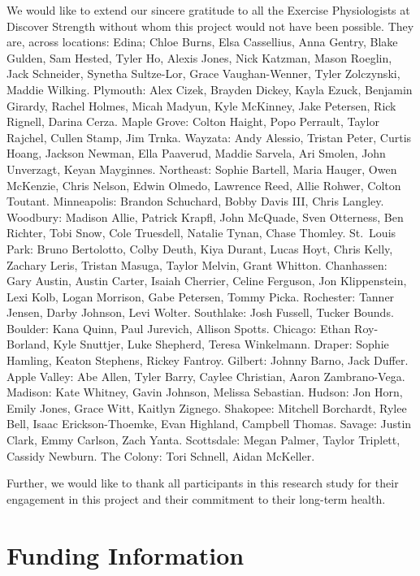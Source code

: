 \documentclass[
]{article}
\begin{document}
We would like to extend our sincere gratitude to all the Exercise
Physiologists at Discover Strength without whom this project would not
have been possible. They are, across locations: Edina; Chloe Burns, Elsa
Cassellius, Anna Gentry, Blake Gulden, Sam Hested, Tyler Ho, Alexis
Jones, Nick Katzman, Mason Roeglin, Jack Schneider, Synetha Sultze-Lor,
Grace Vaughan-Wenner, Tyler Zolczynski, Maddie Wilking. Plymouth: Alex
Cizek, Brayden Dickey, Kayla Ezuck, Benjamin Girardy, Rachel Holmes,
Micah Madyun, Kyle McKinney, Jake Petersen, Rick Rignell, Darina Cerza.
Maple Grove: Colton Haight, Popo Perrault, Taylor Rajchel, Cullen Stamp,
Jim Trnka. Wayzata: Andy Alessio, Tristan Peter, Curtis Hoang, Jackson
Newman, Ella Paaverud, Maddie Sarvela, Ari Smolen, John Unverzagt, Keyan
Mayginnes. Northeast: Sophie Bartell, Maria Hauger, Owen McKenzie, Chris
Nelson, Edwin Olmedo, Lawrence Reed, Allie Rohwer, Colton Toutant.
Minneapolis: Brandon Schuchard, Bobby Davis III, Chris Langley.
Woodbury: Madison Allie, Patrick Krapfl, John McQuade, Sven Otterness,
Ben Richter, Tobi Snow, Cole Truesdell, Natalie Tynan, Chase Thomley.
St.~Louis Park: Bruno Bertolotto, Colby Deuth, Kiya Durant, Lucas Hoyt,
Chris Kelly, Zachary Leris, Tristan Masuga, Taylor Melvin, Grant
Whitton. Chanhassen: Gary Austin, Austin Carter, Isaiah Cherrier, Celine
Ferguson, Jon Klippenstein, Lexi Kolb, Logan Morrison, Gabe Petersen,
Tommy Picka. Rochester: Tanner Jensen, Darby Johnson, Levi Wolter.
Southlake: Josh Fussell, Tucker Bounds. Boulder: Kana Quinn, Paul
Jurevich, Allison Spotts. Chicago: Ethan Roy-Borland, Kyle Snuttjer,
Luke Shepherd, Teresa Winkelmann. Draper: Sophie Hamling, Keaton
Stephens, Rickey Fantroy. Gilbert: Johnny Barno, Jack Duffer. Apple
Valley: Abe Allen, Tyler Barry, Caylee Christian, Aaron Zambrano-Vega.
Madison: Kate Whitney, Gavin Johnson, Melissa Sebastian. Hudson: Jon
Horn, Emily Jones, Grace Witt, Kaitlyn Zignego. Shakopee: Mitchell
Borchardt, Rylee Bell, Isaac Erickson-Thoemke, Evan Highland, Campbell
Thomas. Savage: Justin Clark, Emmy Carlson, Zach Yanta. Scottsdale:
Megan Palmer, Taylor Triplett, Cassidy Newburn. The Colony: Tori
Schnell, Aidan McKeller.

Further, we would like to thank all participants in this research study
for their engagement in this project and their commitment to their
long-term health.

\section{Funding Information}\label{funding-information}
\end{document}
